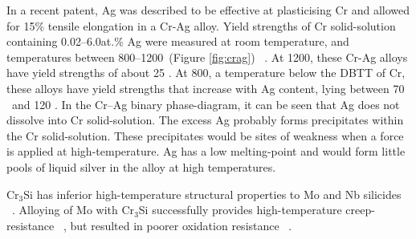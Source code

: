 In a recent patent, Ag was described to be effective at plasticising Cr and allowed for 15\% tensile elongation in a Cr-Ag alloy. Yield strengths of Cr solid-solution containing 0.02--6.0at.\% Ag were measured at room temperature, and temperatures between 800--1200\celsius\ (Figure \ref{fig:crag}) ~\cite{gu07}.  At 1200\celsius, these Cr-Ag alloys have yield strengths of about 25 \mega\pascal.   At 800\celsius, a temperature below the DBTT of Cr, these alloys have yield strengths that increase with Ag content, lying between 70 \mega\pascal\ and 120 \mega\pascal.  In the Cr--Ag binary phase-diagram, it can be seen that Ag does not dissolve into Cr solid-solution.  The excess Ag probably forms precipitates within the Cr solid-solution.  These precipitates would be sites of weakness when a force is applied at high-temperature.  Ag has a low melting-point and would form little pools of liquid silver in the alloy at high temperatures.  

Cr$_3$Si has inferior high-temperature structural properties to Mo and Nb silicides ~\cite{fleischer89, mitra06}.  Alloying of Mo with Cr$_3$Si successfully provides high-temperature creep-resistance ~\cite{raj95a}, but resulted in poorer oxidation resistance ~\cite{tomasi97}.

